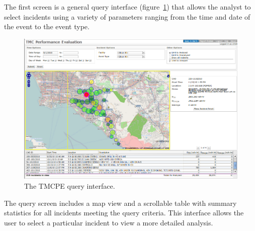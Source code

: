 \documentclass[12pt]{report}
\newcounter{time}
\begin{document}
The first screen is a general query interface
(figure~\ref{fig:tmcpe-query-interface}) that allows the analyst to
select incidents using a variety of parameters ranging from the time
and date of the event to the event type.
\begin{figure}[t]
  \begin{center}
    \includegraphics[width=\textwidth]{images/tmcpe-query-interface.png}
    \caption{The TMCPE query interface.}
    \label{fig:tmcpe-query-interface}
  \end{center}
\end{figure}
The query screen includes a map view and a scrollable table with summary
statistics for all incidents meeting the query criteria.  This interface allows
the user to select a particular incident to view a more detailed analysis.
\end{document}
